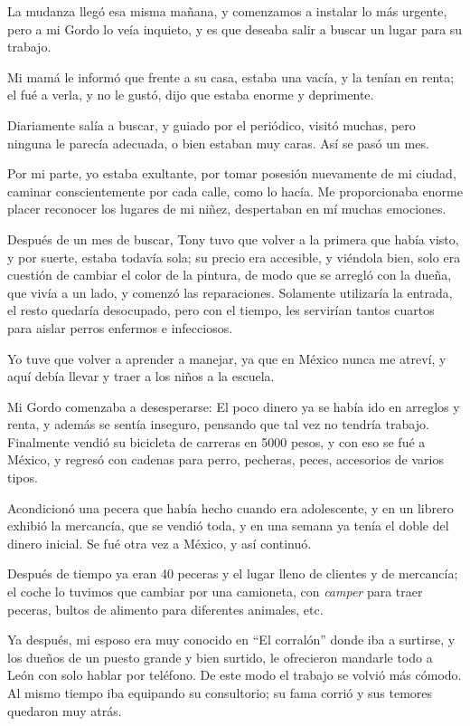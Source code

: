 \documentclass[letterpaper, 12pt]{book}
\begin{document}
La mudanza llegó esa misma mañana, y comenzamos a instalar lo más urgente, pero a mi Gordo lo veía inquieto, y es que deseaba salir a buscar un lugar para su trabajo. 

Mi mamá le informó que frente a su casa, estaba una vacía, y la tenían en renta; el fué a verla, y no le gustó, dijo que estaba enorme y deprimente.

Diariamente salía a buscar, y guiado por el periódico, visitó muchas, pero ninguna le parecía adecuada, o bien estaban muy caras. Así se pasó un mes.

Por mi parte, yo estaba exultante, por tomar posesión nuevamente de mi ciudad, caminar conscientemente por cada calle, como lo hacía. Me proporcionaba enorme placer reconocer los lugares de mi niñez, despertaban en mí muchas emociones. 

Después de un mes de buscar, Tony tuvo que volver a la primera que había visto, y por suerte, estaba todavía sola; su precio era accesible, y viéndola bien, solo era cuestión de cambiar el color de la pintura, de modo que se arregló con la dueña, que vivía a un lado, y comenzó las reparaciones. Solamente utilizaría la entrada, el resto quedaría desocupado, pero con el tiempo, les servirían tantos cuartos para aislar perros enfermos e infecciosos. 

Yo tuve que volver a aprender a manejar, ya que en México nunca me atreví, y aquí debía llevar y traer a los niños a la escuela.

Mi Gordo comenzaba a desesperarse: El poco dinero ya se había ido en arreglos y renta, y además se sentía inseguro, pensando que tal vez no tendría trabajo. Finalmente vendió su bicicleta de carreras en 5000 pesos, y con eso se fué a México, y regresó con cadenas para perro, pecheras, peces, accesorios de varios tipos.

Acondicionó una pecera que había hecho cuando era adolescente, y en un librero exhibió la mercancía, que se vendió toda, y en una semana ya tenía el doble del dinero inicial. Se fué otra vez a México, y así continuó. 

Después de tiempo ya eran 40 peceras y el lugar lleno de clientes y de mercancía; el coche lo tuvimos que cambiar por una camioneta, con \textit{camper} para traer peceras, bultos de alimento para diferentes animales, etc. 

Ya después, mi esposo era muy conocido en ``El corralón'' donde iba a surtirse, y los dueños de un puesto grande y bien surtido, le ofrecieron mandarle todo a León con solo hablar por teléfono. De este modo el trabajo se volvió más cómodo. Al mismo tiempo iba equipando su consultorio; su fama corrió y sus temores quedaron muy atrás.
\end{document}
